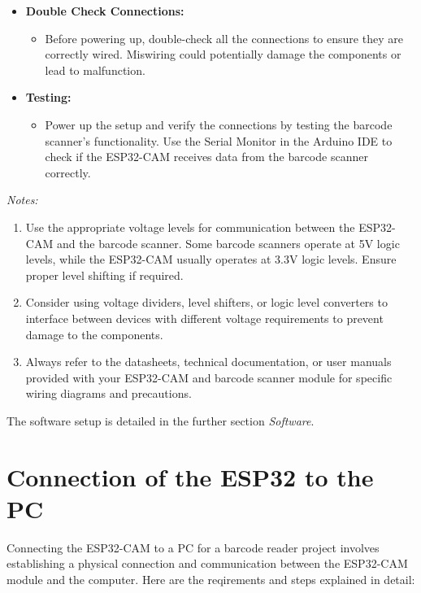 \begin{itemize}
\begin{itemize}
    \end{itemize}
    \item \textbf {Double Check Connections:}
    \begin{itemize}
        \item Before powering up, double-check all the connections to ensure they are correctly wired. Miswiring could potentially damage the components or lead to malfunction.
    \end{itemize}
    \item \textbf {Testing:}
    \begin{itemize}
        \item Power up the setup and verify the connections by testing the barcode scanner's functionality. Use the Serial Monitor in the Arduino IDE to check if the ESP32-CAM receives data from the barcode scanner correctly.
    \end{itemize}
\end{itemize}

\textit{Notes:}
\begin{enumerate}
    \item Use the appropriate voltage levels for communication between the ESP32-CAM and the barcode scanner. Some barcode scanners operate at 5V logic levels, while the ESP32-CAM usually operates at 3.3V logic levels. Ensure proper level shifting if required.
    \item Consider using voltage dividers, level shifters, or logic level converters to interface between devices with different voltage requirements to prevent damage to the components.
    \item Always refer to the datasheets, technical documentation, or user manuals provided with your ESP32-CAM and barcode scanner module for specific wiring diagrams and precautions.
\end{enumerate}

\bigskip

The software setup is detailed in the further section \textit{Software}.

\bigskip

\section{Connection of the ESP32 to the PC}

Connecting the ESP32-CAM to a PC for a barcode reader project involves establishing a physical connection and communication between the ESP32-CAM module and the computer. Here are the reqirements and steps explained in detail:

